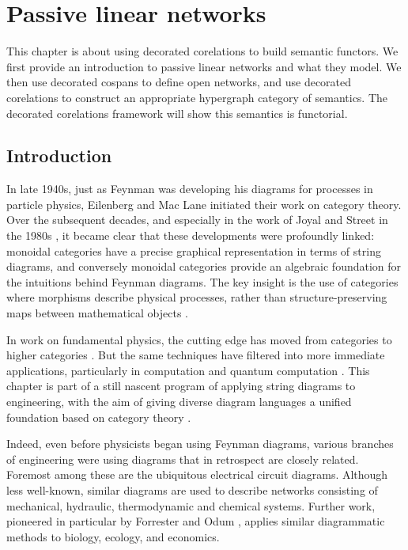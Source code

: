 \chapter{Passive linear networks} \label{ch.circuits}
This chapter is about using decorated corelations to build semantic functors. We
first provide an introduction to passive linear networks and what they model. We
then use decorated cospans to define open networks, and use decorated
corelations to construct an appropriate hypergraph category of semantics. The
decorated corelations framework will show this semantics is functorial.

\section{Introduction}\label{sec:intro}
In late 1940s, just as Feynman was developing his diagrams for processes in particle physics, Eilenberg and Mac Lane initiated their work on category theory.  Over the subsequent decades, and especially in the work of Joyal and Street in the 1980s \cite{JS1,JS2}, it became clear that these developments were profoundly linked: monoidal categories have a precise graphical representation in terms of string diagrams, and conversely monoidal categories provide an algebraic foundation for the intuitions behind Feynman diagrams.  The key insight is the use of categories where morphisms describe physical processes, rather than structure-preserving maps between mathematical objects \cite{BaezStay,CP}.

In work on fundamental physics, the cutting edge has moved from categories
to higher categories \cite{BL}.  But the same techniques have filtered into more
immediate applications, particularly in computation and quantum computation
\cite{AC,Ba1,Se}.  This chapter is part of a still nascent program of applying string diagrams to engineering, with the aim of giving diverse diagram languages a unified foundation based on category theory \cite{BE,BSZ,KSW,RSW,Sp}. 

Indeed, even before physicists began using Feynman diagrams, various branches of engineering were using diagrams that in retrospect are closely related.   Foremost among these are the ubiquitous electrical circuit diagrams. Although less well-known, similar diagrams are used to describe networks consisting of mechanical, hydraulic, thermodynamic and chemical systems.   Further work, pioneered in particular by 
Forrester \cite{Fo} and Odum \cite{Od}, applies similar diagrammatic methods to biology, ecology, and economics.

